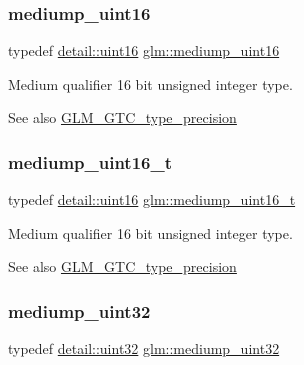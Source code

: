 \subsubsection{\texorpdfstring{mediump\+\_\+uint16}{mediump\_uint16}}
{\footnotesize\ttfamily typedef \mbox{\hyperlink{namespaceglm_1_1detail_a47b2a7d006d187338e8031a352d1ce56}{detail\+::uint16}} \mbox{\hyperlink{group__gtc__type__precision_ga2cef3a0d7b0fce75c9885f64656d8933}{glm\+::mediump\+\_\+uint16}}}

Medium qualifier 16 bit unsigned integer type. \begin{DoxySeeAlso}{See also}
\mbox{\hyperlink{group__gtc__type__precision}{G\+L\+M\+\_\+\+G\+T\+C\+\_\+type\+\_\+precision}} 
\end{DoxySeeAlso}
\mbox{\label{group__gtc__type__precision_ga0b385466deac5ac96061ef2cdd6db20f}} 
\subsubsection{\texorpdfstring{mediump\+\_\+uint16\+\_\+t}{mediump\_uint16\_t}}
{\footnotesize\ttfamily typedef \mbox{\hyperlink{namespaceglm_1_1detail_a47b2a7d006d187338e8031a352d1ce56}{detail\+::uint16}} \mbox{\hyperlink{group__gtc__type__precision_ga0b385466deac5ac96061ef2cdd6db20f}{glm\+::mediump\+\_\+uint16\+\_\+t}}}

Medium qualifier 16 bit unsigned integer type. \begin{DoxySeeAlso}{See also}
\mbox{\hyperlink{group__gtc__type__precision}{G\+L\+M\+\_\+\+G\+T\+C\+\_\+type\+\_\+precision}} 
\end{DoxySeeAlso}
\mbox{\label{group__gtc__type__precision_ga861dbd1051f488e425b3966001b568e5}} 
\subsubsection{\texorpdfstring{mediump\+\_\+uint32}{mediump\_uint32}}
{\footnotesize\ttfamily typedef \mbox{\hyperlink{namespaceglm_1_1detail_ade6cfbf377022aaa391af8cd50489222}{detail\+::uint32}} \mbox{\hyperlink{group__gtc__type__precision_ga861dbd1051f488e425b3966001b568e5}{glm\+::mediump\+\_\+uint32}}}

